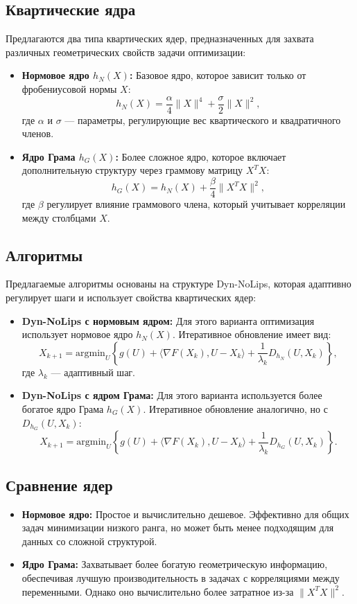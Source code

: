 \documentclass[a4paper,11pt]{article}
\begin{document}
\subsection{Квартические ядра}
Предлагаются два типа квартических ядер, предназначенных для захвата различных геометрических свойств задачи оптимизации:
\begin{itemize}
    \item \textbf{Нормовое ядро \(h_N(X)\):} Базовое ядро, которое зависит только от фробениусовой нормы \(X\):
    \[
    h_N(X) = \frac{\alpha}{4}\|X\|^4 + \frac{\sigma}{2}\|X\|^2,
    \]
    где \(\alpha\) и \(\sigma\) — параметры, регулирующие вес квартического и квадратичного членов.
    \item \textbf{Ядро Грама \(h_G(X)\):} Более сложное ядро, которое включает дополнительную структуру через граммову матрицу \(X^TX\):
    \[
    h_G(X) = h_N(X) + \frac{\beta}{4}\|X^TX\|^2,
    \]
    где \(\beta\) регулирует влияние граммового члена, который учитывает корреляции между столбцами \(X\).
\end{itemize}

\subsection{Алгоритмы}
Предлагаемые алгоритмы основаны на структуре Dyn-NoLips, которая адаптивно регулирует шаги и использует свойства квартических ядер:
\begin{itemize}
    \item \textbf{Dyn-NoLips с нормовым ядром:}
    Для этого варианта оптимизация использует нормовое ядро \(h_N(X)\). Итеративное обновление имеет вид:
    \[
    X_{k+1} = \text{argmin}_U \left\{ g(U) + \langle \nabla F(X_k), U - X_k \rangle + \frac{1}{\lambda_k} D_{h_N}(U, X_k) \right\},
    \]
    где \(\lambda_k\) — адаптивный шаг.
    \item \textbf{Dyn-NoLips с ядром Грама:}
    Для этого варианта используется более богатое ядро Грама \(h_G(X)\). Итеративное обновление аналогично, но с \(D_{h_G}(U, X_k)\):
    \[
    X_{k+1} = \text{argmin}_U \left\{ g(U) + \langle \nabla F(X_k), U - X_k \rangle + \frac{1}{\lambda_k} D_{h_G}(U, X_k) \right\}.
    \]
\end{itemize}

\subsection{Сравнение ядер}
\begin{itemize}
\item \textbf{Нормовое ядро:} Простое и вычислительно дешевое. Эффективно для общих задач минимизации низкого ранга, но может быть менее подходящим для данных со сложной структурой.
    \item \textbf{Ядро Грама:} Захватывает более богатую геометрическую информацию, обеспечивая лучшую производительность в задачах с корреляциями между переменными. Однако оно вычислительно более затратное из-за \(\|X^TX\|^2\).
\end{itemize}
\end{document}
